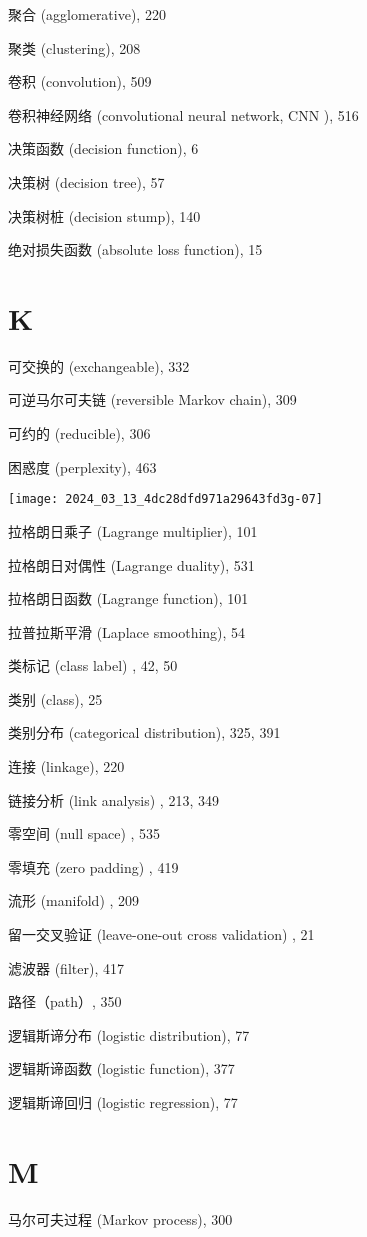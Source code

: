 \documentclass[10pt]{article}
\begin{document}
聚合 (agglomerative), 220

聚类 (clustering), 208

卷积 (convolution), 509

卷积神经网络 (convolutional neural network, CNN ), 516

决策函数 (decision function), 6

决策树 (decision tree), 57

决策树桩 (decision stump), 140

绝对损失函数 (absolute loss function), 15

\section*{K}
可交换的 (exchangeable), 332

可逆马尔可夫链 (reversible Markov chain), 309

可约的 (reducible), 306

困惑度 (perplexity), 463

\begin{center}
\texttt{[image: 2024\_03\_13\_4dc28dfd971a29643fd3g-07]}
\end{center}

拉格朗日乘子 (Lagrange multiplier), 101

拉格朗日对偶性 (Lagrange duality), 531

拉格朗日函数 (Lagrange function), 101

拉普拉斯平滑 (Laplace smoothing), 54

类标记 (class label) , 42, 50

类别 (class), 25

类别分布 (categorical distribution), 325, 391

连接 (linkage), 220

链接分析 (link analysis) , 213, 349

零空间 (null space) , 535

零填充 (zero padding) , 419

流形 (manifold) , 209

留一交叉验证 (leave-one-out cross validation) , 21

滤波器 (filter), 417

路径（path）, 350

逻辑斯谛分布 (logistic distribution), 77

逻辑斯谛函数 (logistic function), 377

逻辑斯谛回归 (logistic regression), 77

\section*{M}
马尔可夫过程 (Markov process), 300
\end{document}
